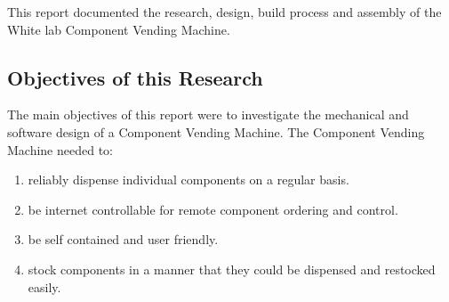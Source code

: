 \documentclass[a4paper,11pt]{article}
\numberwithin{figure}{section}
\numberwithin{table}{section}
\begin{document}
This report documented the research, design, build process and assembly of the White lab Component Vending Machine. 
	\subsection{Objectives of this Research}
The main objectives of this report were to investigate the mechanical and software design of a Component Vending Machine. The Component Vending Machine needed to:
\begin{enumerate}
\item reliably dispense individual components on a regular basis.
\item be internet controllable for remote component ordering and control.
\item be self contained and user friendly.
\item stock components in a manner that they could be dispensed and restocked easily.
\end{enumerate}
\end{document}
